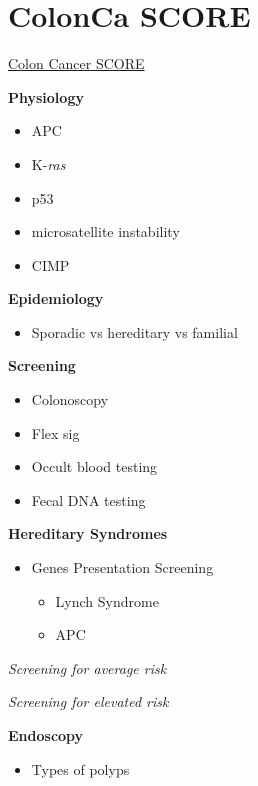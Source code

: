 \documentclass[
]{book}
\providecommand{\tightlist}{%
  \setlength{\itemsep}{0pt}\setlength{\parskip}{0pt}}
\begin{document}
\hypertarget{ColonObjCR}{%
\chapter{ColonCa SCORE}\label{ColonObjCR}}

\href{https://www.surgicalcore.org/modulecontent.aspx?id=1000690}{Colon Cancer SCORE}

\textbf{Physiology}

\begin{itemize}
\tightlist
\item
  APC
\item
  K-\emph{ras}
\item
  p53
\item
  microsatellite instability
\item
  CIMP
\end{itemize}

\textbf{Epidemiology}

\begin{itemize}
\tightlist
\item
  Sporadic vs hereditary vs familial
\end{itemize}

\textbf{Screening}

\begin{itemize}
\tightlist
\item
  Colonoscopy
\item
  Flex sig
\item
  Occult blood testing
\item
  Fecal DNA testing
\end{itemize}

\textbf{Hereditary Syndromes}

\begin{itemize}
\tightlist
\item
  Genes \textbar{} Presentation \textbar{} Screening

  \begin{itemize}
  \tightlist
  \item
    Lynch Syndrome
  \item
    APC
  \end{itemize}
\end{itemize}

\emph{Screening for average risk}

\emph{Screening for elevated risk}

\textbf{Endoscopy}

\begin{itemize}
\tightlist
\item
  Types of polyps
\end{itemize}
\end{document}
